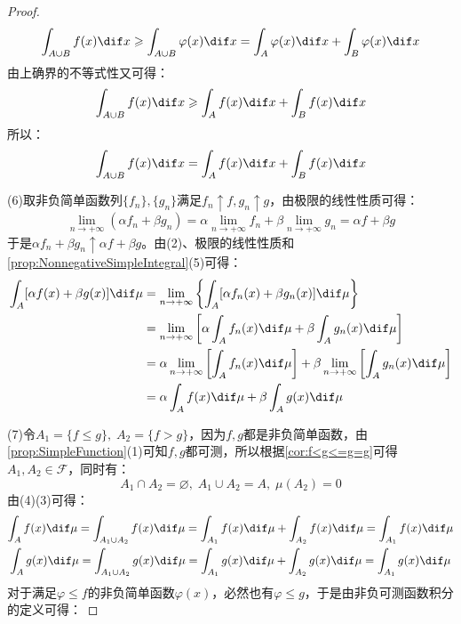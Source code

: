 \begin{proof}
\begin{equation*}
		\int_{A\cup B}f(x)\dif x\geqslant\int_{A\cup B}\varphi(x)\dif x=\int_{A}\varphi(x)\dif x+\int_{B}\varphi(x)\dif x
	\end{equation*}
	由上确界的不等式性又可得：
	\begin{equation*}
		\int_{A\cup B}f(x)\dif x\geqslant\int_{A}f(x)\dif x+\int_{B}f(x)\dif x
	\end{equation*}
	所以：
	\begin{equation*}
		\int_{A\cup B}f(x)\dif x=\int_{A}f(x)\dif x+\int_{B}f(x)\dif x
	\end{equation*}\par
	(6)取非负简单函数列$\{f_n\},\{g_n\}$满足$f_n\uparrow f,g_n\uparrow g$，由极限的线性性质可得：
	\begin{equation*}
		\lim_{n\to+\infty}(\alpha f_n+\beta g_n)=\alpha\lim_{n\to+\infty}f_n+\beta\lim_{n\to+\infty}g_n=\alpha f+\beta g
	\end{equation*}
	于是$\alpha f_n+\beta g_n\uparrow\alpha f+\beta g$。由(2)、极限的线性性质和\cref{prop:NonnegativeSimpleIntegral}(5)可得：
	\begin{align*}
		\int_{A}^{}[\alpha f(x)+\beta g(x)]\dif\mu
		&=\lim_{n\to+\infty}\left\{\int_{A}^{}[\alpha f_n(x)+\beta g_n(x)]\dif\mu\right\} \\
		&=\lim_{n\to+\infty}\left[\alpha\int_{A}^{}f_n(x)\dif\mu+\beta\int_{A}^{}g_n(x)\dif\mu\right] \\
		&=\alpha\lim_{n\to+\infty}\left[\int_{A}^{}f_n(x)\dif\mu\right]+\beta\lim_{n\to+\infty}\left[\int_{A}^{}g_n(x)\dif\mu\right] \\
		&=\alpha\int_{A}^{}f(x)\dif\mu+\beta\int_{A}^{}g(x)\dif\mu
	\end{align*}\par
	(7)令$A_1=\{f\leqslant g\},\;A_2=\{f>g\}$，因为$f,g$都是非负简单函数，由\cref{prop:SimpleFunction}(1)可知$f,g$都可测，所以根据\cref{cor:f<g<=g=g}可得$A_1,A_2\in \mathscr{F}$，同时有：
	\begin{equation*}
		A_1\cap A_2=\varnothing,\;A_1\cup A_2=A,\;\mu(A_2)=0
	\end{equation*}
	由(4)(3)可得：
	\begin{gather*}
		\int_{A}f(x)\dif\mu=\int_{A_1\cup A_2}f(x)\dif\mu=\int_{A_1}f(x)\dif\mu+\int_{A_2}f(x)\dif\mu=\int_{A_1}f(x)\dif\mu \\
		\int_{A}g(x)\dif\mu=\int_{A_1\cup A_2}g(x)\dif\mu=\int_{A_1}g(x)\dif\mu+\int_{A_2}g(x)\dif\mu=\int_{A_1}g(x)\dif\mu
	\end{gather*}
	对于满足$\varphi\leqslant f$的非负简单函数$\varphi(x)$，必然也有$\varphi\leqslant g$，于是由非负可测函数积分的定义可得：

\end{proof}
